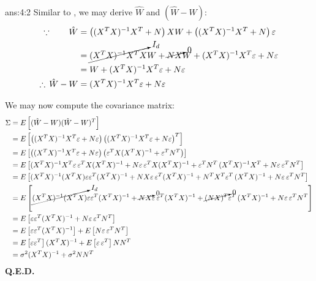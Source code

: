 \documentclass{tron}
\begin{document}
\begin{answer}[]{ans:4:2}
	Similar to , we may derive $\hat{W}$ and $(\hat{W} - W)$:
	\begin{align}
		\because \qquad \hat{W} &= \left((X^T X)^{-1}X^T + N\right)XW + \left((X^T X)^{-1}X^T + N\right)\varepsilon \\
			&= \cancelto{I_d}{(X^T X)^{-1}X^TX}W + \cancelto{0}{NX}W + (X^T X)^{-1}X^T \varepsilon + N \varepsilon \\
			&= W + (X^T X)^{-1}X^T \varepsilon + N \varepsilon \\
		\therefore \, \hat{W} - W &= (X^T X)^{-1}X^T \varepsilon + N \varepsilon
	\end{align}
	
	We may now compute the covariance matrix:
	\begin{align}
		\Sigma &= E\left[ (\hat{W} - W) (\hat{W} - W)^T \right] \\
			&= E\left[ \left((X^T X)^{-1}X^T \varepsilon + N \varepsilon \right) \left((X^T X)^{-1}X^T \varepsilon + N \varepsilon\right)^T \right] \\
			&= E\left[\left((X^T X)^{-1}X^T \varepsilon + N \varepsilon \right) \left(\varepsilon^TX(X^T X)^{-1} + \varepsilon^T N^T \right)\right]\\
			&= E\left[(X^T X)^{-1}X^T \varepsilon \, \varepsilon^TX(X^T X)^{-1} + N \varepsilon \, \varepsilon^TX(X^T X)^{-1} + \varepsilon^T  N^T  \, (X^T X)^{-1}X^T + N \varepsilon \, \varepsilon^T  N^T \right]\\
			&=  E\left[(X^T X)^{-1}(X^TX) \varepsilon \varepsilon^T (X^T X)^{-1} + NX\varepsilon \, \varepsilon^T(X^T X)^{-1} + N^T X^T \varepsilon^T  \, (X^T X)^{-1} + N \varepsilon \, \varepsilon^T  N^T \right]\\
			&=  E\left[\cancelto{I_d}{(X^T X)^{-1}(X^TX)} \varepsilon \varepsilon^T (X^T X)^{-1} + \cancelto{0}{NX}\varepsilon \, \varepsilon^T(X^T X)^{-1} + \cancelto{0}{(NX)^T} \varepsilon^T  \, (X^T X)^{-1} + N \varepsilon \, \varepsilon^T  N^T \right] \\
			&=  E\left[\varepsilon \varepsilon^T (X^T X)^{-1} + N \varepsilon \, \varepsilon^T  N^T \right]\\
			&=  E\left[\varepsilon \varepsilon^T (X^T X)^{-1}\right] +  E\left[N \varepsilon \, \varepsilon^T  N^T \right]\\
			&=  E\left[\varepsilon \varepsilon^T\right] (X^T X)^{-1} +  E\left[ \varepsilon \, \varepsilon^T\right] N  N^T \\
			&= \sigma^2(X^T X)^{-1} + \sigma^2 N  N^T 
	\end{align}
	\textbf{Q.E.D.}
	

\end{answer}
\end{document}
